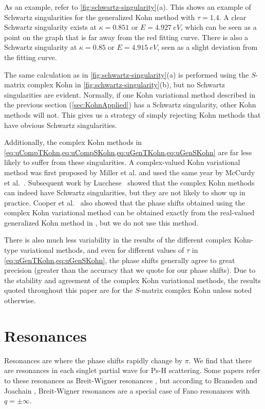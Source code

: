 \documentclass[Dissertation.tex]{subfiles}
\begin{document}
As an example, refer to \cref{fig:schwartz-singularity}(a). This shows an 
example of Schwartz singularities for the generalized Kohn method with
$\tau = 1.4$. A clear Schwartz singularity exists at $\kappa = 0.851$ or $E = \SI{4.927}{eV}$,
which can be seen as a point on the graph that is far away from 
the red fitting curve. There is also a Schwartz singularity at $\kappa = 0.85$
or $E = \SI{4.915}{eV}$, seen as a slight deviation from the fitting curve.

The same calculation as in \cref{fig:schwartz-singularity}(a) is performed 
using the $S$-matrix complex Kohn in \cref{fig:schwartz-singularity}(b), but 
no Schwartz singularities are evident. Normally, if one Kohn variational 
method described in the previous section (\cref{sec:KohnApplied}) has a 
Schwartz singularity, other Kohn methods will not. This gives us a strategy 
of simply rejecting Kohn methods that have obvious Schwartz singularities.



Additionally, the complex Kohn methods in
\cref{eq:uCompTKohn,eq:uCompSKohn,eq:uGenTKohn,eq:uGenSKohn} are far less likely to 
suffer from these singularities. A complex-valued Kohn variational method was 
first proposed by Miller et al. \cite{Miller1987} and used the same year by 
McCurdy et al.~\cite{McCurdy1987}. Subsequent work by
Lucchese~\cite{Lucchese1989} showed that the complex Kohn methods can indeed have
Schwartz singularities, but they are not likely to show up in practice.
Cooper et al.~\cite{Cooper2010} also showed that the phase shifts obtained using the 
complex Kohn variational method can be obtained exactly from the real-valued 
generalized Kohn method in \cite{eq:uGenKohn}, but we do not use this method.

There is also much less variability in the results of the different complex 
Kohn-type variational methods, and even for different values of $\tau$ in
\cref{eq:uGenTKohn,eq:uGenSKohn}, the phase shifts generally agree to great 
precision (greater than the accuracy that we quote for our phase shifts). Due 
to the stability and agreement of the complex Kohn variational methods, the results quoted 
throughout this paper are for the $S$-matrix complex Kohn unless noted 
otherwise.




\section{Resonances}
\label{sec:Resonances}
Resonances are where the phase shifts rapidly change by $\pi$. We find that 
there are resonances in each singlet partial wave for Ps-H scattering. Some 
papers refer to these resonances as Breit-Wigner resonances
\cite{Tennyson1984,Stibbe1998}, but according to Bransden and Joachain
\cite[p.596]{Bransden2003}, Breit-Wigner resonances are a special case of Fano
resonances with $q = \pm\infty$.
\end{document}
